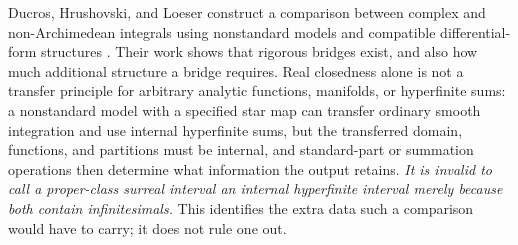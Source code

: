 \documentclass[11pt,letterpaper]{article}
\theoremstyle{definition}
\theoremstyle{remark}
\numberwithin{equation}{section}
\begin{document}
Ducros, Hrushovski, and Loeser construct a comparison between complex and
non-Archimedean integrals using nonstandard models and compatible differential-form
structures \cite{DHL}. Their work shows that rigorous bridges exist, and also how
much additional structure a bridge requires. Real closedness alone is not a transfer
principle for arbitrary analytic functions, manifolds, or hyperfinite sums: a
nonstandard model with a specified star map can transfer ordinary smooth integration
and use internal hyperfinite sums, but the transferred domain, functions, and
partitions must be internal, and standard-part or summation operations then
determine what information the output retains. \emph{It is invalid to call a
proper-class surreal interval an internal hyperfinite interval merely because both
contain infinitesimals.} This identifies the extra data such a comparison would have
to carry; it does not rule one out.
\end{document}
